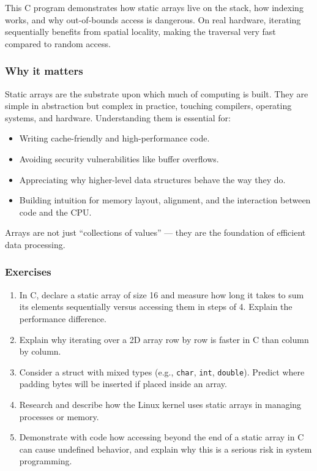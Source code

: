 \documentclass[
  letterpaper,
  DIV=11,
  numbers=noendperiod]{scrreprt}
\providecommand{\tightlist}{%
  \setlength{\itemsep}{0pt}\setlength{\parskip}{0pt}}
\begin{document}
This C program demonstrates how static arrays live on the stack, how
indexing works, and why out-of-bounds access is dangerous. On real
hardware, iterating sequentially benefits from spatial locality, making
the traversal very fast compared to random access.

\subsubsection{Why it matters}\label{why-it-matters-14}

Static arrays are the substrate upon which much of computing is built.
They are simple in abstraction but complex in practice, touching
compilers, operating systems, and hardware. Understanding them is
essential for:

\begin{itemize}
\tightlist
\item
  Writing cache-friendly and high-performance code.
\item
  Avoiding security vulnerabilities like buffer overflows.
\item
  Appreciating why higher-level data structures behave the way they do.
\item
  Building intuition for memory layout, alignment, and the interaction
  between code and the CPU.
\end{itemize}

Arrays are not just ``collections of values'' --- they are the
foundation of efficient data processing.

\subsubsection{Exercises}\label{exercises-14}

\begin{enumerate}
\def\labelenumi{\arabic{enumi}.}
\tightlist
\item
  In C, declare a static array of size 16 and measure how long it takes
  to sum its elements sequentially versus accessing them in steps of 4.
  Explain the performance difference.
\item
  Explain why iterating over a 2D array row by row is faster in C than
  column by column.
\item
  Consider a struct with mixed types (e.g., \texttt{char}, \texttt{int},
  \texttt{double}). Predict where padding bytes will be inserted if
  placed inside an array.
\item
  Research and describe how the Linux kernel uses static arrays in
  managing processes or memory.
\item
  Demonstrate with code how accessing beyond the end of a static array
  in C can cause undefined behavior, and explain why this is a serious
  risk in system programming.
\end{enumerate}
\end{document}
